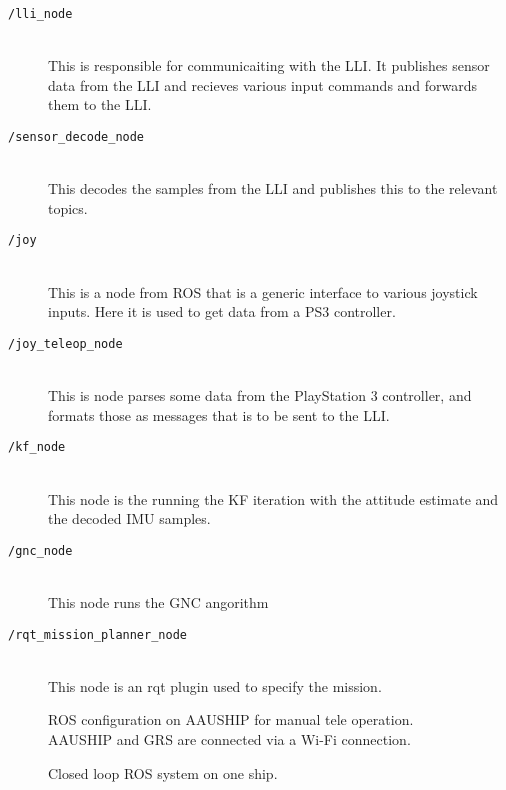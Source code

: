 \begin{description}
	\item[\texttt{/lli\_node}]\hfill \\
		This is responsible for communicaiting with the \ac{LLI}. It
		publishes sensor data from the \ac{LLI} and recieves various input
		commands and forwards them to the \ac{LLI}.
	\item[\texttt{/sensor\_decode\_node}]\hfill \\
		This decodes the samples from the \ac{LLI} and publishes this to
		the relevant topics. 
	\item[\texttt{/joy}]\hfill \\
		This is a node from \ac{ROS} that is a generic interface to
		various joystick inputs. Here it is used to get data from a PS3
		controller.
	\item[\texttt{/joy\_teleop\_node}]\hfill \\
		This is node parses some data from the PlayStation 3 controller, and formats
		those as messages that is to be sent to the \ac{LLI}.
	\item[\texttt{/kf\_node}]\hfill \\
		This node is the running the \ac{KF} iteration with the attitude estimate and
		the decoded \ac{IMU} samples.
	\item[\texttt{/gnc\_node}]\hfill \\
		This node runs the \ac{GNC} angorithm
	\item[\texttt{/rqt\_mission\_planner\_node}]\hfill \\
		This node is an rqt plugin used to specify the mission.
\end{description}

\begin{figure}[htbp]
	\centering
	
	\caption{ROS configuration on AAUSHIP for manual tele operation.
	AAUSHIP and GRS are connected via a Wi-Fi connection.}
	\label{fig:ros-aauship-teleop}
\end{figure}

\begin{figure}[htbp]
	\centering
	{\footnotesize
	}
	\caption{Closed loop ROS system on one ship.}
	\label{fig:ros-aauship-closed-loop-single}
\end{figure}


